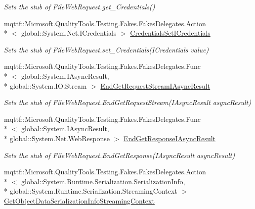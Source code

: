 \begin{DoxyCompactItemize}
\begin{DoxyCompactList}\small\item\em Sets the stub of File\-Web\-Request.\-get\-\_\-\-Credentials()\end{DoxyCompactList}\item 
mqttf\-::\-Microsoft.\-Quality\-Tools.\-Testing.\-Fakes.\-Fakes\-Delegates.\-Action\\*
$<$ global\-::\-System.\-Net.\-I\-Credentials $>$ \hyperlink{class_system_1_1_net_1_1_fakes_1_1_stub_file_web_request_ad42c716e33bfd76511ec3fe3be5f6a88}{Credentials\-Set\-I\-Credentials}
\begin{DoxyCompactList}\small\item\em Sets the stub of File\-Web\-Request.\-set\-\_\-\-Credentials(\-I\-Credentials value)\end{DoxyCompactList}\item 
mqttf\-::\-Microsoft.\-Quality\-Tools.\-Testing.\-Fakes.\-Fakes\-Delegates.\-Func\\*
$<$ global\-::\-System.\-I\-Async\-Result, \\*
global\-::\-System.\-I\-O.\-Stream $>$ \hyperlink{class_system_1_1_net_1_1_fakes_1_1_stub_file_web_request_a6ff8b8b7411bb3741d9344237319b792}{End\-Get\-Request\-Stream\-I\-Async\-Result}
\begin{DoxyCompactList}\small\item\em Sets the stub of File\-Web\-Request.\-End\-Get\-Request\-Stream(\-I\-Async\-Result async\-Result)\end{DoxyCompactList}\item 
mqttf\-::\-Microsoft.\-Quality\-Tools.\-Testing.\-Fakes.\-Fakes\-Delegates.\-Func\\*
$<$ global\-::\-System.\-I\-Async\-Result, \\*
global\-::\-System.\-Net.\-Web\-Response $>$ \hyperlink{class_system_1_1_net_1_1_fakes_1_1_stub_file_web_request_a2a431d0aed7c466e77180dc22a9f993e}{End\-Get\-Response\-I\-Async\-Result}
\begin{DoxyCompactList}\small\item\em Sets the stub of File\-Web\-Request.\-End\-Get\-Response(\-I\-Async\-Result async\-Result)\end{DoxyCompactList}\item 
mqttf\-::\-Microsoft.\-Quality\-Tools.\-Testing.\-Fakes.\-Fakes\-Delegates.\-Action\\*
$<$ global\-::\-System.\-Runtime.\-Serialization.\-Serialization\-Info, \\*
global\-::\-System.\-Runtime.\-Serialization.\-Streaming\-Context $>$ \hyperlink{class_system_1_1_net_1_1_fakes_1_1_stub_file_web_request_abfc5d09d4f60a523fd163ab58fb20674}{Get\-Object\-Data\-Serialization\-Info\-Streaming\-Context}

\end{DoxyCompactItemize}
